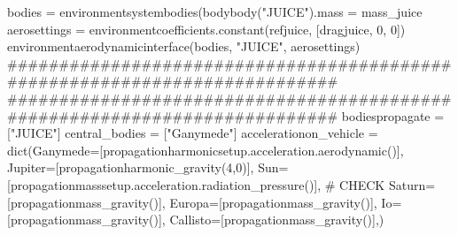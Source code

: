 {}
\markdownRendererSectionEnd \markdownRendererSectionBegin
{}\markdownRendererInterblockSeparator
{}bodies = environmentsystembodies(bodybody("JUICE").mass = mass_juice\markdownRendererInterblockSeparator
{}
\markdownRendererSectionEnd \markdownRendererSectionBegin
{}\markdownRendererInterblockSeparator
{}aerosettings = environmentcoefficients.constant(refjuice, [dragjuice, 0, 0]) environmentaerodynamicinterface(bodies, "JUICE", aerosettings)\markdownRendererInterblockSeparator
{}###########################################################################\markdownRendererInterblockSeparator
{}
\markdownRendererSectionEnd \markdownRendererSectionBegin
{}\markdownRendererInterblockSeparator
{}###########################################################################\markdownRendererInterblockSeparator
{}
\markdownRendererSectionEnd \markdownRendererSectionBegin
{}\markdownRendererInterblockSeparator
{}bodiespropagate = ["JUICE"] central_bodies = ["Ganymede"]\markdownRendererInterblockSeparator
{}
\markdownRendererSectionEnd \markdownRendererSectionBegin
{}\markdownRendererInterblockSeparator
{}accelerationon_vehicle = dict(Ganymede=[propagationharmonicsetup.acceleration.aerodynamic()], Jupiter=[propagationharmonic_gravity(4,0)], Sun=[propagationmasssetup.acceleration.radiation_pressure()], # CHECK Saturn=[propagationmass_gravity()], Europa=[propagationmass_gravity()], Io=[propagationmass_gravity()], Callisto=[propagationmass_gravity()],)\markdownRendererInterblockSeparator
